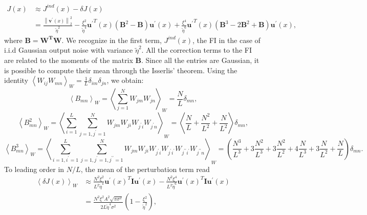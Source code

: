 \documentclass[a4paper]{article}%
\begin{document}
\begin{equation}%
\begin{split}
J(x)  &  \approx J^{ind}(x) - \delta J(x)\\
&  = \frac{\left\|  \mathbf{v^{\prime}}(x)\right\|  _{2}^{2}}{\tilde\eta^{2}}
-\frac{\xi^{2}} {\tilde\eta^{4}} \mathbf{u^{\prime}}^{T}(x) \left(
\mathbf{B}^{2} - \mathbf{B} \right)  \mathbf{u^{\prime}}(x) + \frac{\xi^{4}%
}{\tilde\eta^{6}}\mathbf{u^{\prime} }^{T}(x) \left(  \mathbf{B}^{3} -
2\mathbf{B}^{2} + \mathbf{B}\right)  \mathbf{u^{\prime} }(x),
\end{split}
\label{Eq:FIapprox}%
\end{equation}where $\mathbf{B}= \mathbf{W^T W }$.
We recognize in the first term, $J^{ind}(x)$, the FI in the case of i.i.d
Gaussian output noise with variance $\tilde{\eta}^{2}$. All the correction
terms to the FI are related to the moments of the matrix $\mathbf{B}$. Since
all the entries are Gaussian, it is possible to compute their mean through the
Isserlis' theorem. Using the identity $\left\langle W_{ij}W_{mn}\right\rangle
_{W} = \frac{1}{L}\delta_{im} \delta_{jn}$, we obtain:
\begin{equation}
\left\langle B_{mn}\right\rangle _{W} = \left\langle \sum_{j=1}^{N} W_{jm}
W_{jn}\right\rangle _{W} = \frac{N}{L}\delta_{mn},
\end{equation}
\begin{equation}
\left\langle B^{2}_{mn}\right\rangle _{W} = \left\langle \sum_{i=1}^{L}
\sum_{j=1,j^{\prime}=1}^{N} W_{jm} W_{ji}W_{j^{\prime}i}W_{j^{\prime}
n}\right\rangle _{W} = \left\langle \frac{N}{L} + \frac{N^{2}}{L^{2}} +
\frac{N}{L^{2}}\right \rangle \delta_{mn},
\end{equation}
\begin{equation}
\left\langle B^{3}_{mn}\right\rangle _{W} = \left\langle \sum_{i=1,i^{\prime}
=1}^{L} \sum_{j=1,j^{\prime}=1,j^{\prime\prime}=1}^{N} W_{jm}W_{ji}
W_{j^{\prime}i}W_{j^{\prime}i^{\prime}}W_{j^{\prime\prime}i^{\prime}%
}W_{j^{\prime\prime}n}\right\rangle _{W} =\left(  \frac{N^{3} }{L^{3}} +
3\frac{N^{2}}{L^{3}} + 3\frac{N^{2}}{L^{2}} + 4\frac{N}{L^{3}} + 3\frac
{N}{L^{2}} + \frac{N}{L} \right)  \delta_{mn}.
\end{equation}
To leading order in $N/L$, the mean of
the perturbation term read
\begin{equation}%
\begin{split}
\left\langle \delta J(x)\right\rangle _{W}  &  \approx\frac{N^{2}\xi^{2}
}{L^{2}\tilde\eta^{4}} \mathbf{u^{\prime}}(x)^{T} \mathbf{I} \mathbf{u^{\prime
}}(x) -\frac{N^{2}\xi^{4}}{L^{2}\tilde\eta^{6}} \mathbf{u^{\prime}}(x)^{T}
\mathbf{I} \mathbf{u^{\prime}}(x)\\
&  = \frac{N^{2}\xi^{2}A^{2} \sqrt{\pi\sigma^{2}}}{2L\tilde\eta^{4} \sigma
^{2}}\left(  1- \frac{\xi^{2}}{\tilde\eta^{2}}\right)  ,
\end{split}
\label{Eq:deltaJ}%
\end{equation}
\end{document}
